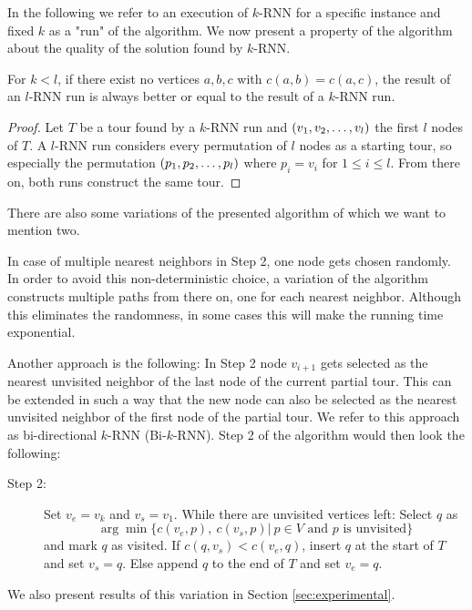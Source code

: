In the following we refer to an execution of $k$-RNN for a specific instance and fixed $k$ as a "run" of the algorithm.
We now present a property of the algorithm about the quality of the solution found by $k$-RNN.
\begin{theorem}
	\label{theo:quality}
	For $k < l$, if there exist no vertices $a, b, c$ with $c(a, b) = c(a, c)$, the result of an $l$-RNN run is always better or equal to the result of a $k$-RNN run.
\end{theorem}
\begin{proof}
	Let $T$ be a tour found by a $k$-RNN run and $(v_1, v_2, \mathellipsis, v_l)$ the first $l$ nodes of $T$. 
	A $l$-RNN run considers every permutation of $l$ nodes as a starting tour, so especially the permutation $(p_1, p_2, \mathellipsis, p_l)$ where $p_i = v_i$ for $1 \leq i \leq l$. 
	From there on, both runs construct the same tour.
\end{proof}

There are also some variations of the presented algorithm of which we want to mention two.

In case of multiple nearest neighbors in Step 2, one node gets chosen randomly. 
In order to avoid this non-deterministic choice, a variation of the algorithm constructs multiple paths from there on, one for each nearest neighbor. 
Although this eliminates the randomness, in some cases this will make the running time exponential.

Another approach is the following:
In Step 2 node $v_{i+1}$ gets selected as the nearest unvisited neighbor of the last node of the current partial tour. 
This can be extended in such a way that the new node can also be selected as the nearest unvisited neighbor of the first node of the partial tour. 
We refer to this approach as bi-directional $k$-RNN (Bi-$k$-RNN). Step 2 of the algorithm would then look the following:

\begin{description}
	\item[Step 2:] Set $v_e = v_k$ and $v_s = v_1$. 
	While there are unvisited vertices left: 
	Select $q$ as 
	\[
	\arg \min\{c(v_e, p),\ c(v_s, p) |\ p \in V \text{ and $p$ is unvisited}\}
	\] 
	and mark $q$ as visited. If $c(q, v_s) < c (v_e, q)$, insert $q$ at the start of $T$ and set $v_s = q$. Else append $q$ to the end of $T$ and set $v_e = q$.
\end{description}

We also present results of this variation in Section \ref{sec:experimental}.
